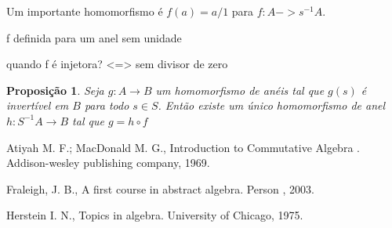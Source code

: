 \documentclass[10pt,a4paper]{article}
\newtheorem{proposition}[theorem]{Proposição}
\begin{document}
Um importante homomorfismo é $f(a)=a/1$ para $f:A->s^{-1}A$.

f definida para um anel sem unidade

quando f é injetora? <=> sem divisor de zero

\begin{proposition} Seja $g:A \rightarrow B$ um homomorfismo de anéis tal que $g(s)$ é invertível em $B$ para todo $s \in S$. Então existe um único homomorfismo de anel $h:S^{-1}A \rightarrow B$ tal que $g = h\circ f$
\end{proposition}




\newpage

\begin{thebibliography}{20}
	
	  Atiyah M. F.; MacDonald M. G., Introduction to Commutative Algebra . Addison-wesley publishing company, 1969.
	
	  Fraleigh, J. B., A first course in abstract algebra. Person , 2003.
	
	 Herstein I. N., Topics in algebra. University of Chicago, 1975.	
	
\end{thebibliography}
\end{document}
